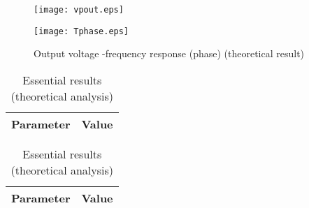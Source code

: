 \begin{figure}[h] \centering
  \begin{minipage}{.45\textwidth}
    \texttt{[image: vpout.eps]}
    \caption{Output voltage -frequency response (phase) (simulation result)}
    \label{fig:vpout}
  \end{minipage}%
    \hspace{2 mm}
  \begin{minipage}{.45\textwidth}
  \centering
    \texttt{[image: Tphase.eps]}
    \caption{Output voltage -frequency response (phase) (theoretical result)}
    \label{fig:compvpout}
      \end{minipage}%
\end{figure}

\newpage

\begin{table}[!htb]
  \begin{minipage}{.5\linewidth}
     \centering
  \begin{tabular}{|c|c|}
    \hline    
    {\bf Parameter} & {\bf Value} \\ \hline
    
    
 \end{tabular}
 \caption{Essential results (simulation analysis)}
 \label{tab:sim}
  \end{minipage}
    \hspace{2 mm}
    \begin{minipage}{.5\linewidth}
      \centering
        \begin{tabular}{|c|c|}
    \hline    
    {\bf Parameter} & {\bf Value} \\ \hline
    
 \end{tabular}
        \caption{Essential results (theoretical analysis)}
        \label{tab:compsim}
    \end{minipage} 
\end{table}



